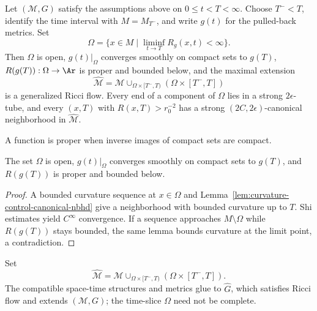 \begin{theorem}
\label{thm:singular-time-limit-properties}\label{omega}
Let $({\mathcal M},G)$ satisfy the assumptions above on $0\le t<T<\infty$.
Choose $T^-<T$, identify the time interval with $M=M_{T^-}$, and write
$g(t)$ for the pulled-back metrics. Set
$$\Omega=\{x\in M\mid\liminf_{t\to T}R_g(x,t)<\infty\}.$$
Then $\Omega$ is open, $g(t)|_\Omega$ converges smoothly on compact sets to
$g(T)$, $R(g(T)):\Omega\to\Ar$ is proper and bounded below, and the maximal
extension
$$\widehat{\mathcal M}={\mathcal M}\cup_{\Omega\times[T^-,T)}
(\Omega\times[T^-,T])$$
is a generalized Ricci flow. Every end of a component of $\Omega$ lies in a
strong $2\epsilon$-tube, and every $(x,T)$ with $R(x,T)>r_0^{-2}$ has a
strong $(2C,2\epsilon)$-canonical neighborhood in $\widehat{\mathcal M}$.
\end{theorem}
\begin{remark}\label{rem:proper-function}
A function is proper when inverse images of compact sets are compact.
\end{remark}

\begin{lemma}
\label{lem:omega-open-limit-metric}\label{Rproper}
The set $\Omega$ is open, $g(t)|_\Omega$ converges smoothly on compact sets
to $g(T)$, and $R(g(T))$ is proper and bounded below.
\end{lemma}
\begin{proof}\sketch A bounded
curvature sequence at $x\in\Omega$ and Lemma~\ref{lem:curvature-control-canonical-nbhd}
give a neighborhood with bounded curvature up to $T$. Shi estimates yield
$C^\infty$ convergence. If a sequence approaches $M\setminus\Omega$ while
$R(g(T))$ stays bounded, the same lemma bounds curvature at the limit point,
a contradiction.\end{proof}

\begin{definition}
\label{def:maximal-extension-to-time-T}\label{hatM}
Set
$$\widehat {\mathcal M}= {\mathcal M}\cup_{\Omega\times[T^-,T)}
(\Omega\times[T^-,T]).$$
The compatible space-time structures and metrics glue to $\widehat G$,
which satisfies Ricci flow and extends $({\mathcal M},G)$; the time-slice
$\Omega$ need not be complete.
\end{definition}

